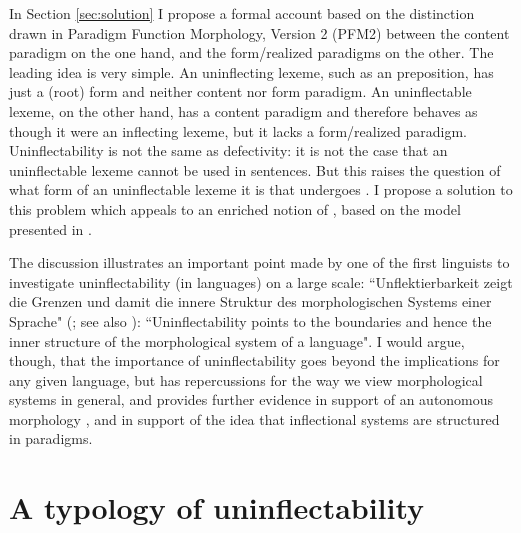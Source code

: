 \documentclass[output=paper,colorlinks,citecolor=brown]{langscibook}
\begin{document}
In Section \ref{sec:solution} I propose a formal account based on the distinction drawn in Paradigm Function Morphology, Version 2 (PFM2) \citep{stump2016} between the content paradigm on the one hand, and the form/realized paradigms on the other. The leading idea is very simple.  An uninflecting lexeme, such as an  preposition, has just a (root) form and neither content nor form paradigm. An uninflectable lexeme, on the other hand, has a content paradigm and therefore behaves as though it were an inflecting lexeme, but it lacks a form/realized paradigm. Uninflectability is not the same as defectivity: it is not the case that an uninflectable lexeme cannot be used in sentences. But this raises the question of what form of an uninflectable lexeme it is that undergoes . I propose a solution to this problem which appeals to an enriched notion of , based on the model presented in \citet{spencer2013}. 

The discussion illustrates an important point made by one of the first linguists to investigate uninflectability (in  languages) on a large scale: 
``Unflektierbarkeit zeigt die Grenzen und damit die innere Struktur des morphologischen Systems einer Sprache" (\citealp[60]{doleschal2002-mici}; see also \citealp{doleschal2001}): ``Uninflectability points to the boundaries and hence the inner structure of the morphological system of a language". I would argue, though, that the importance of  uninflectability goes beyond the implications for any given language, but has repercussions for the way we view morphological systems in general, and provides further evidence in support of an autonomous morphology \citep[cf][]{aronoff1994}, and in support of the idea that inflectional systems are structured in paradigms.

\section{A typology of uninflectability} \label{sec:typology}
\end{document}
